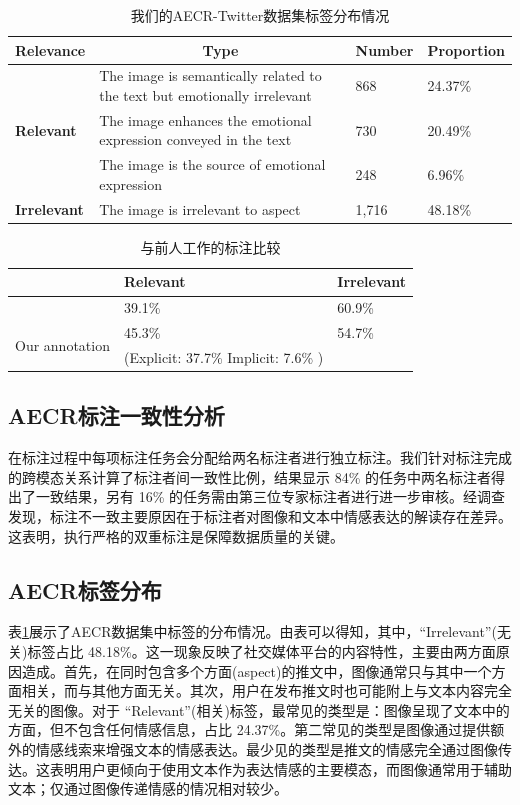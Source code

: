 \setlength{\tabcolsep}{2.5pt}
\begin{table}[!htbp]
  \centering
  \caption{我们的AECR-Twitter数据集标签分布情况}
  \label{tab:labeldistribution}
\begin{tabular}{llll}
\toprule
  \textbf{Relevance} & \multicolumn{1}{c}{\textbf{Type}}& \textbf{Number} &\textbf{Proportion} \\
  \hline
  \multirow{3}{*}{\textbf{Relevant}} & The image is semantically related to the text but emotionally irrelevant  &  868 &  24.37\%  \\
       & The image enhances the emotional expression conveyed in the text & 730 & 20.49\%  \\
       & The image is the source of emotional expression & 248 & 6.96\%  \\
       \hline
  \textbf{Irrelevant}  & The image is irrelevant to aspect  & 1,716  & 48.18\% \\
\bottomrule
\end{tabular}
\end{table}


\setlength{\tabcolsep}{2.5pt}
\begin{table}[!htbp]
  \centering
\caption{与前人工作的标注比较}
\label{tab:ComparedwithPrevious}
\begin{tabular}{lll}
\toprule
   & \textbf{Relevant}  &    \textbf{Irrelevant} \\
   \hline
   \citet{yu2022targeted}  & 39.1\%      & 60.9\%     \\
   \hline
  \multirow{2}{*}{Our annotation}  &45.3\%          & 54.7\%  \\
  &(Explicit: 37.7\%           Implicit: 7.6\%  ) & \\
\bottomrule
\end{tabular}
\end{table}

\subsection{AECR标注一致性分析}
在标注过程中每项标注任务会分配给两名标注者进行独立标注。我们针对标注完成的跨模态关系计算了标注者间一致性比例，结果显示 84\% 的任务中两名标注者得出了一致结果，另有 16\% 的任务需由第三位专家标注者进行进一步审核。经调查发现，标注不一致主要原因在于标注者对图像和文本中情感表达的解读存在差异。这表明，执行严格的双重标注是保障数据质量的关键。

\subsection{AECR标签分布}
表\ref{tab:labeldistribution}展示了AECR数据集中标签的分布情况。由表可以得知，其中，“Irrelevant”(无关)标签占比 48.18\%。这一现象反映了社交媒体平台的内容特性，主要由两方面原因造成。首先，在同时包含多个方面(aspect)的推文中，图像通常只与其中一个方面相关，而与其他方面无关。其次，用户在发布推文时也可能附上与文本内容完全无关的图像。对于 “Relevant”(相关)标签，最常见的类型是：图像呈现了文本中的方面，但不包含任何情感信息，占比 24.37\%。第二常见的类型是图像通过提供额外的情感线索来增强文本的情感表达。最少见的类型是推文的情感完全通过图像传达。这表明用户更倾向于使用文本作为表达情感的主要模态，而图像通常用于辅助文本；仅通过图像传递情感的情况相对较少。

